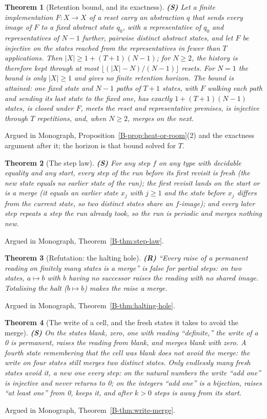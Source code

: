 \documentclass[11pt, a4paper]{report}
\theoremstyle{definition}
\theoremstyle{plain}
\newtheorem{theorem}{Theorem}[chapter]
\begin{document}
\begin{theorem}[Retention bound, and its exactness] \textbf{(S)}
Let a finite implementation $F : X \to X$ of a reset carry an abstraction $q$ that sends every image of $F$ to a fixed abstract state $q_0$, with a representative of $q_0$ and representatives of $N - 1$ further, pairwise distinct abstract states, and let $F$ be injective on the states reached from the representatives in fewer than $T$ applications. Then $|X| \ge 1 + (T+1)(N-1)$; for $N \ge 2$, the history is therefore kept through at most $\lfloor(|X|-N)/(N-1)\rfloor$ resets. For $N=1$ the bound is only $|X| \ge 1$ and gives no finite retention horizon. The bound is attained: one fixed state and $N - 1$ paths of $T + 1$ states, with $F$ walking each path and sending its last state to the fixed one, has exactly $1 + (T+1)(N-1)$ states, is closed under $F$, meets the reset and representative premises, is injective through $T$ repetitions, and, when $N \ge 2$, merges on the next.
\end{theorem}
\noindent Argued in Monograph, Proposition~\ref{B-prop:heat-or-room}(2) and the exactness argument after it; the horizon is that bound solved for $T$.

\begin{theorem}[The step law] \textbf{(S)}
For any step $f$ on any type with decidable equality and any start, every step of the run before its first revisit is fresh (the new state equals no earlier state of the run); the first revisit lands on the start or is a merge (it equals an earlier state $x_j$ with $j \ge 1$ and the state before $x_j$ differs from the current state, so two distinct states share an $f$-image); and every later step repeats a step the run already took, so the run is periodic and merges nothing new.
\end{theorem}
\noindent Argued in Monograph, Theorem~\ref{B-thm:step-law}.

\begin{theorem}[Refutation: the halting hole] \textbf{(R)}
``Every raise of a permanent reading on finitely many states is a merge'' is false for partial steps: on two states, $a \mapsto b$ with $b$ having no successor raises the reading with no shared image. Totalising the halt ($b \mapsto b$) makes the raise a merge.
\end{theorem}
\noindent Argued in Monograph, Theorem~\ref{B-thm:halting-hole}.

\begin{theorem}[The write of a cell, and the fresh states it takes to avoid the merge] \textbf{(S)}
On the states blank, zero, one with reading ``definite,'' the write of a 0 is permanent, raises the reading from blank, and merges blank with zero. A fourth state remembering that the cell was blank does not avoid the merge: the write on four states still merges two distinct states. Only endlessly many fresh states avoid it, a new one every step: on the natural numbers the write ``add one'' is injective and never returns to 0; on the integers ``add one'' is a bijection, raises ``at least one'' from 0, keeps it, and after $k > 0$ steps is away from its start.
\end{theorem}
\noindent Argued in Monograph, Theorem~\ref{B-thm:write-merge}.
\end{document}
